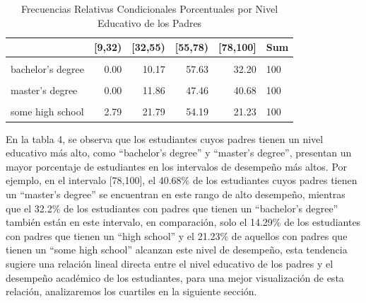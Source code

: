 \documentclass[
]{article}
\begin{document}
\begin{table}[!h]
\centering
\caption{\label{tab:tabla de frecuencias relativas porcentuales condicionales 1 }Frecuencias Relativas Condicionales Porcentuales por Nivel Educativo de los Padres}
\centering
\begin{tabular}[t]{lrrrrl}
\toprule
  & {}[9,32) & {}[32,55) & {}[55,78) & {}[78,100] & Sum\\
\midrule
\cellcolor{gray!10}{associate's degree} & \cellcolor{gray!10}{0.45} & \cellcolor{gray!10}{16.67} & \cellcolor{gray!10}{54.50} & \cellcolor{gray!10}{28.38} & \cellcolor{gray!10}{100}\\
bachelor's degree & 0.00 & 10.17 & 57.63 & 32.20 & 100\\
\cellcolor{gray!10}{high school} & \cellcolor{gray!10}{2.04} & \cellcolor{gray!10}{27.04} & \cellcolor{gray!10}{56.63} & \cellcolor{gray!10}{14.29} & \cellcolor{gray!10}{100}\\
master's degree & 0.00 & 11.86 & 47.46 & 40.68 & 100\\
\cellcolor{gray!10}{some college} & \cellcolor{gray!10}{1.77} & \cellcolor{gray!10}{12.83} & \cellcolor{gray!10}{59.73} & \cellcolor{gray!10}{25.66} & \cellcolor{gray!10}{100}\\
\addlinespace
some high school & 2.79 & 21.79 & 54.19 & 21.23 & 100\\
\bottomrule
\end{tabular}
\end{table}

En la tabla 4, se observa que los estudiantes cuyos padres tienen un
nivel educativo más alto, como ``bachelor's degree'' y ``master's
degree'', presentan un mayor porcentaje de estudiantes en los intervalos
de desempeño más altos. Por ejemplo, en el intervalo {[}78,100{]}, el
40.68\% de los estudiantes cuyos padres tienen un ``master's degree'' se
encuentran en este rango de alto desempeño, mientras que el 32.2\% de
los estudiantes con padres que tienen un ``bachelor's degree'' también
están en este intervalo, en comparación, solo el 14.29\% de los
estudiantes con padres que tienen un ``high school'' y el 21.23\% de
aquellos con padres que tienen un ``some high school'' alcanzan este
nivel de desempeño, esta tendencia sugiere una relación lineal directa
entre el nivel educativo de los padres y el desempeño académico de los
estudiantes, para una mejor visualización de esta relación, analizaremos
los cuartiles en la siguiente sección.
\end{document}
